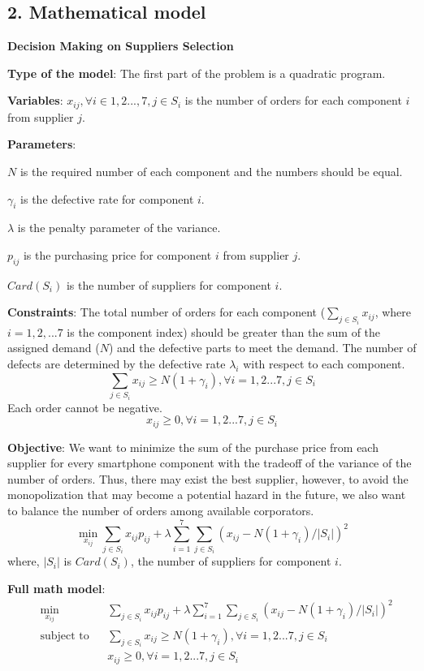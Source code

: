 \documentclass[11pt]{article}
\begin{document}
    \hypertarget{mathematical-model}{%
\subsection{2. Mathematical model}\label{mathematical-model}}

\textbf{Decision Making on Suppliers Selection}

\textbf{Type of the model}: The first part of the problem is a quadratic
program.

\textbf{Variables}: \(x_{ij}, \forall i\in 1,2...,7, j\in S_i\) is the
number of orders for each component \(i\) from supplier \(j\).

\textbf{Parameters}:

\(N\) is the required number of each component and the numbers should be
equal.

\(\gamma_i\) is the defective rate for component \(i\).

\(\lambda\) is the penalty parameter of the variance.

\(p_{ij}\) is the purchasing price for component \(i\) from supplier
\(j\).

\(Card(S_i)\) is the number of suppliers for component \(i\).

\textbf{Constraints}: The total number of orders for each component
(\(\sum_{j\in S_i} x_{ij}\), where \(i= 1,2,...7\) is the component
index) should be greater than the sum of the assigned demand (\(N\)) and
the defective parts to meet the demand. The number of defects are
determined by the defective rate \(\lambda_i\) with respect to each
component.
\[\sum_{j\in S_i} x_{ij}\geq N(1+\gamma_i), \forall i= 1,2...7, j\in S_i\]
Each order cannot be negative.
\[x_{ij}\geq 0, \forall i= 1,2...7, j\in S_i\]

\textbf{Objective}: We want to minimize the sum of the purchase price
from each supplier for every smartphone component with the tradeoff of
the variance of the number of orders. Thus, there may exist the best
supplier, however, to avoid the monopolization that may become a
potential hazard in the future, we also want to balance the number of
orders among available corporators.
\[\mathop{\min}\limits_{x_{ij}} \sum_{j\in S_i} x_{ij}p_{ij}+\lambda \sum_{i=1}^7 \sum_{j\in S_i}(x_{ij}-N(1+\gamma_i)/|S_i|)^2\]
where, \(|S_i|\) is \(Card(S_i)\), the number of suppliers for component
\(i\).

\textbf{Full math model}: \[  \begin{aligned}
  & \underset{x_{ij}}{\text{min}}
  & & \sum_{j\in S_i} x_{ij}p_{ij}+\lambda \sum_{i=1}^7 \sum_{j\in S_i}(x_{ij}-N(1+\gamma_i)/|S_i|)^2 \\
  & \text{subject to}
  & & \sum_{j\in S_i} x_{ij}\geq N(1+\gamma_i), \forall i= 1,2...7, j\in S_i \\
  &&& x_{ij} \geq 0, \forall i= 1,2...7, j\in S_i \\
  \end{aligned}\]
\end{document}
